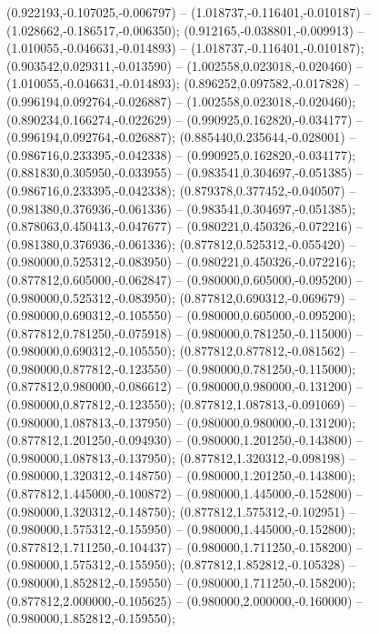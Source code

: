  (0.922193,-0.107025,-0.006797) -- (1.018737,-0.116401,-0.010187) -- (1.028662,-0.186517,-0.006350);
 (0.912165,-0.038801,-0.009913) -- (1.010055,-0.046631,-0.014893) -- (1.018737,-0.116401,-0.010187);
 (0.903542,0.029311,-0.013590) -- (1.002558,0.023018,-0.020460) -- (1.010055,-0.046631,-0.014893);
 (0.896252,0.097582,-0.017828) -- (0.996194,0.092764,-0.026887) -- (1.002558,0.023018,-0.020460);
 (0.890234,0.166274,-0.022629) -- (0.990925,0.162820,-0.034177) -- (0.996194,0.092764,-0.026887);
 (0.885440,0.235644,-0.028001) -- (0.986716,0.233395,-0.042338) -- (0.990925,0.162820,-0.034177);
 (0.881830,0.305950,-0.033955) -- (0.983541,0.304697,-0.051385) -- (0.986716,0.233395,-0.042338);
 (0.879378,0.377452,-0.040507) -- (0.981380,0.376936,-0.061336) -- (0.983541,0.304697,-0.051385);
 (0.878063,0.450413,-0.047677) -- (0.980221,0.450326,-0.072216) -- (0.981380,0.376936,-0.061336);
 (0.877812,0.525312,-0.055420) -- (0.980000,0.525312,-0.083950) -- (0.980221,0.450326,-0.072216);
 (0.877812,0.605000,-0.062847) -- (0.980000,0.605000,-0.095200) -- (0.980000,0.525312,-0.083950);
 (0.877812,0.690312,-0.069679) -- (0.980000,0.690312,-0.105550) -- (0.980000,0.605000,-0.095200);
 (0.877812,0.781250,-0.075918) -- (0.980000,0.781250,-0.115000) -- (0.980000,0.690312,-0.105550);
 (0.877812,0.877812,-0.081562) -- (0.980000,0.877812,-0.123550) -- (0.980000,0.781250,-0.115000);
 (0.877812,0.980000,-0.086612) -- (0.980000,0.980000,-0.131200) -- (0.980000,0.877812,-0.123550);
 (0.877812,1.087813,-0.091069) -- (0.980000,1.087813,-0.137950) -- (0.980000,0.980000,-0.131200);
 (0.877812,1.201250,-0.094930) -- (0.980000,1.201250,-0.143800) -- (0.980000,1.087813,-0.137950);
 (0.877812,1.320312,-0.098198) -- (0.980000,1.320312,-0.148750) -- (0.980000,1.201250,-0.143800);
 (0.877812,1.445000,-0.100872) -- (0.980000,1.445000,-0.152800) -- (0.980000,1.320312,-0.148750);
 (0.877812,1.575312,-0.102951) -- (0.980000,1.575312,-0.155950) -- (0.980000,1.445000,-0.152800);
 (0.877812,1.711250,-0.104437) -- (0.980000,1.711250,-0.158200) -- (0.980000,1.575312,-0.155950);
 (0.877812,1.852812,-0.105328) -- (0.980000,1.852812,-0.159550) -- (0.980000,1.711250,-0.158200);
 (0.877812,2.000000,-0.105625) -- (0.980000,2.000000,-0.160000) -- (0.980000,1.852812,-0.159550);
